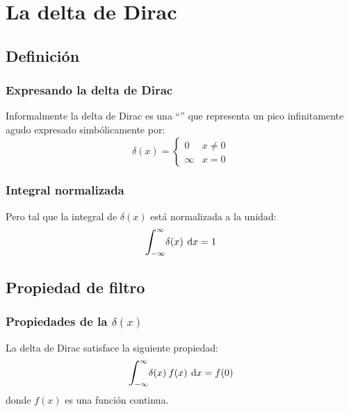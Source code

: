 \documentclass[12pt]{beamer}
\begin{document}

\section{La delta de Dirac}
\subsection{Definición}

\begin{frame}
\frametitle{Expresando la delta de Dirac}
Informalmente la delta de Dirac es una \enquote{} que representa un pico infinitamente agudo expresado simbólicamente por:
\pause
\begin{equation}
\delta (x) = \begin{cases}
0 & x \neq 0 \\
\infty & x = 0
\end{cases}
\label{eq:ecuacion_delta_01}
\end{equation}
\end{frame}

\begin{frame}
\frametitle{Integral normalizada}
Pero tal que la integral de $\delta (x)$ está normalizada a la unidad:
\pause
\begin{equation}
\scaleint{6ex}_{\bs -\infty}^{\infty} \delta (x) \: \dd{x} = 1 
\label{eq:ecuacion_delta_02}
\end{equation}
\end{frame}

\subsection{Propiedad de filtro}

\begin{frame}
\frametitle{Propiedades de la $\delta (x)$}
La delta de Dirac satisface la siguiente propiedad:
\pause
\begin{equation}
\scaleint{6ex}_{\bs -\infty}^{\infty} \delta (x) \: f (x) \: \dd{x} = f (0)
\label{eq:ecuacion_delta_03}
\end{equation}
donde $f (x)$ es una función continua.
\end{frame}
\end{document}

